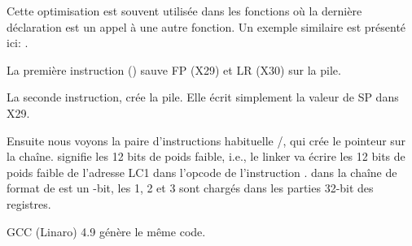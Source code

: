 Cette optimisation est souvent utilisée dans les fonctions où la dernière déclaration
est un appel à une autre fonction.
Un exemple similaire est présenté ici:
.






La première instruction  () sauve \ac{FP} (X29) et \ac{LR} (X30) sur la pile.

La seconde instruction,  crée la pile.
Elle écrit simplement la valeur de \ac{SP} dans X29.

Ensuite nous voyons la paire d'instructions habituelle /\ADD, qui crée
le pointeur sur la chaîne.
 signifie les 12 bits de poids faible, i.e., le linker va écrire les 12 bits
de poids faible de l'adresse LC1 dans l'opcode de l'instruction \ADD.
 dans la chaîne de format de \printf est un -bit, les 1, 2 et
3 sont chargés dans les parties 32-bit des registres.

GCC (Linaro) 4.9 \Optimizing génère le même code.

